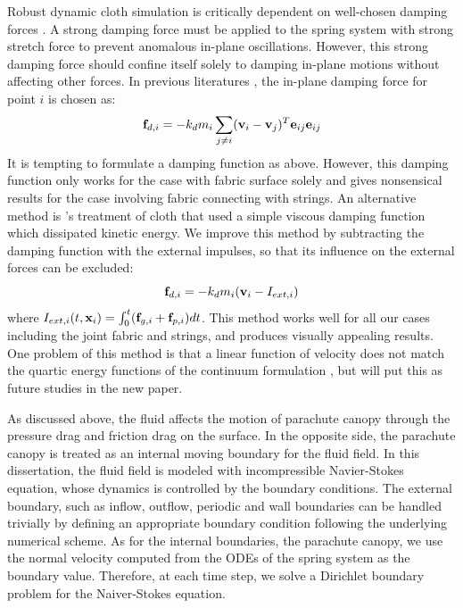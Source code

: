Robust dynamic cloth simulation is critically dependent on well-chosen damping forces \cite{}. A strong damping force must be applied to the spring system with strong stretch force to prevent anomalous in-plane oscillations. However, this strong damping force should confine itself solely to damping in-plane motions without affecting other forces. In previous literatures \cite{}, the in-plane damping force for point $i$ is chosen as:
\begin{equation}
\mathbf{f}_{d,i} = -k_d m_i\sum_{j \neq i}(\mathbf{v}_i - \mathbf{v}_j)^T\mathbf{e}_{ij}\mathbf{e}_{ij}
\label{eq:damping_1} 
\end{equation}
It is tempting to formulate a damping function as above. However, this damping function only works for the case with fabric surface solely and gives nonsensical results for the case involving fabric connecting with strings. An alternative method is \cite{Terzopoulos87, Terzopoulos88, Carignan1992, Platt1988}'s treatment of cloth that used a simple viscous damping function which dissipated kinetic energy. We improve this method by subtracting the damping function with the external impulses, so that its influence on the external forces can be excluded:
\begin{equation}
\mathbf{f}_{d,i} = -k_d m_i(\mathbf{v}_i-I_{ext,i})
\end{equation}
where $I_{ext,i}(t,\mathbf{x}_i) = \int_0^t (\mathbf{f}_{g,i} + \mathbf{f}_{p,i}) dt$.
This method works well for all our cases including the joint fabric and strings, and produces visually appealing results. One problem of this method is that a linear function of velocity does not match the quartic energy functions of the continuum formulation \cite{Baraff1998}, but will put this as future studies in the new paper.

As discussed above, the fluid affects the motion of parachute canopy through the pressure drag and friction drag on the surface. In the opposite side, the parachute canopy is treated as an internal moving boundary for the fluid field. In this dissertation, the fluid field is modeled with incompressible Navier-Stokes equation, whose dynamics is controlled by the boundary conditions. The external boundary, such as inflow, outflow, periodic and wall boundaries can be handled trivially by defining an appropriate boundary condition following the underlying numerical scheme. As for the internal boundaries, the parachute canopy, we use the normal velocity computed from the ODEs of the spring system as the boundary value. Therefore, at each time step, we solve a Dirichlet boundary problem for the Naiver-Stokes equation.
